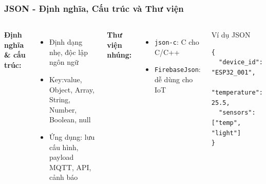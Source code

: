 \begin{frame}[fragile]
\frametitle{JSON - Định nghĩa, Cấu trúc và Thư viện}

\begin{columns}[T]
\textbf{Định nghĩa & cấu trúc:}
\begin{itemize}
\item Định dạng nhẹ, độc lập ngôn ngữ
\item Key:value, Object, Array, String, Number, Boolean, null
\item Ứng dụng: lưu cấu hình, payload MQTT, API, cảnh báo
\end{itemize}

\textbf{Thư viện nhúng:}
\begin{itemize}
\item \texttt{json-c}: C cho C/C++
\item \texttt{FirebaseJson}: dễ dùng cho IoT
\end{itemize}

\begin{exampleblock}{Ví dụ JSON}
\begin{verbatim}
{
  "device_id": "ESP32_001",
  "temperature": 25.5,
  "sensors": ["temp", "light"]
}
\end{verbatim}
\end{exampleblock}
\end{columns}

\end{frame}

